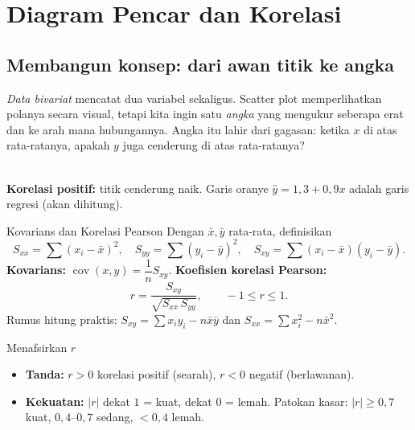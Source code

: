 \documentclass[11pt,a4paper]{report}
\theoremstyle{gaya}
\begin{document}
\section{Diagram Pencar dan Korelasi}

\subsection*{Membangun konsep: dari awan titik ke angka}
\emph{Data bivariat} mencatat dua variabel sekaligus. Scatter plot memperlihatkan polanya secara visual, tetapi kita ingin satu \emph{angka} yang mengukur seberapa erat dan ke arah mana hubungannya. Angka itu lahir dari gagasan: ketika $x$ di atas rata-ratanya, apakah $y$ juga cenderung di atas rata-ratanya?

\begin{center}
\\
\small \textbf{Korelasi positif:} titik cenderung naik. Garis oranye $\hat y=1{,}3+0{,}9x$ adalah garis regresi (akan dihitung).
\end{center}

\begin{konsep}{Kovarians dan Korelasi Pearson}
Dengan $\bar x,\bar y$ rata-rata, definisikan
\[
S_{xx}=\sum (x_i-\bar x)^2,\quad
S_{yy}=\sum (y_i-\bar y)^2,\quad
S_{xy}=\sum (x_i-\bar x)(y_i-\bar y).
\]
\textbf{Kovarians:} $\operatorname{cov}(x,y)=\dfrac{1}{n}S_{xy}$. \quad
\textbf{Koefisien korelasi Pearson:}
\[
r=\frac{S_{xy}}{\sqrt{S_{xx}\,S_{yy}}},\qquad -1\le r\le 1.
\]
Rumus hitung praktis: $S_{xy}=\sum x_iy_i-n\bar x\bar y$ dan $S_{xx}=\sum x_i^2-n\bar x^2$.
\end{konsep}

\begin{konsep}{Menafsirkan $r$}
\begin{itemize}[leftmargin=*,topsep=2pt]
  \item \textbf{Tanda:} $r>0$ korelasi positif (searah), $r<0$ negatif (berlawanan).
  \item \textbf{Kekuatan:} $|r|$ dekat $1$ = kuat, dekat $0$ = lemah. Patokan kasar: $|r|\ge0{,}7$ kuat, $0{,}4$--$0{,}7$ sedang, $<0{,}4$ lemah.
\end{itemize}
\end{konsep}
\end{document}
